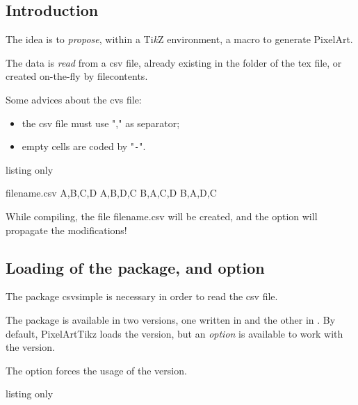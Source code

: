 \documentclass{article}
\newcommand\Cle[1]{{\bfseries\sffamily\textlangle #1\textrangle}}
\begin{document}
\subsection{Introduction}

The idea is to \textit{propose}, within a Ti\textit{k}Z environment, a macro to generate PixelArt.

The data is \textit{read} from a \textsf{csv} file, already existing in the folder of the \textsf{tex} file, or created on-the-fly by \textsf{filecontents}.

\medskip

Some advices about the \textsf{cvs} file:

\begin{itemize}
	\item the \textsf{csv} file must use "," as separator;
	\item empty cells are coded by "\texttt{-}".
\end{itemize}

\begin{PresentationCode}{listing only}
\begin{filecontents*}{filename.csv}
	A,B,C,D
	A,B,D,C
	B,A,C,D
	B,A,D,C
\end{filecontents*}
\end{PresentationCode}

While compiling, the file \textsf{filename.csv} will be created, and the option \Cle{[overwrite]} will propagate the modifications!

\subsection{Loading of the package, and option}

The package \textsf{csvsimple} is necessary in order to read the \textsf{csv} file.

The package is available in two versions, one written in  and the other in . By default, \textsf{PixelArtTikz} loads the  version, but an \textit{option} is available to work with the  version.

\smallskip

The option \Cle{[csvii]} forces the usage of the  version.

\begin{PresentationCode}{listing only}
\usepackage{PixelArtTikz}                     %

\usepackage[csvii]{PixelArtTikz}              %
\end{PresentationCode}
\end{document}
